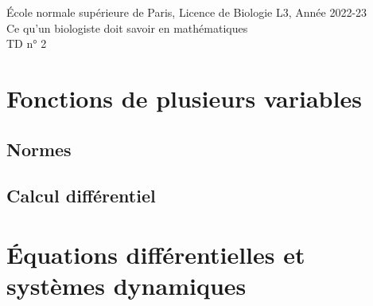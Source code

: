 \documentclass[french, 12pt]{article}
\numberwithin{exercise}{section}
\numberwithin{equation}{section}
\begin{document}

\begin{center}
  \small{\sc \'Ecole normale supérieure de Paris, Licence de Biologie L3, Année 2022-23} \\
  \bigskip
  \large{Ce qu'un biologiste doit savoir en mathématiques} \\
  \bigskip  
  {TD n° 2}
\end{center}

\section{Fonctions de plusieurs variables} 
\newcommand{\multivar}{/home/robin/ENSEIGN/Cours/MathBiologie/L3-ENS-Math1/Exercices/MultiVar}

\subsection{Normes}





\subsection{Calcul différentiel}





\section{\'Equations différentielles et systèmes dynamiques} 
\newcommand{\equadiff}{/home/robin/ENSEIGN/Cours/MathBiologie/L3-ENS-Math1/Exercices/EquaDiff}
\end{document}
